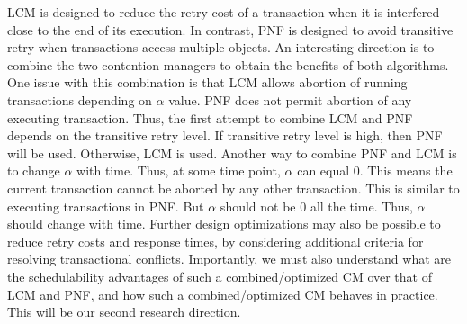 \documentclass[12pt,english]{report}
\begin{document}
LCM is designed to reduce the retry cost of a transaction when it is interfered close to the end of its execution. In contrast, PNF is designed to avoid transitive retry when transactions access multiple objects. An interesting direction is to combine the two contention managers to obtain the benefits of both algorithms. 
One issue with this combination is that LCM allows abortion of running transactions depending on $\alpha$ value. PNF does not permit abortion of any executing transaction. Thus, the first attempt to combine LCM and PNF depends on the transitive retry level. If transitive retry level is high, then PNF will be used. Otherwise, LCM is used. Another way to combine PNF and LCM is to change $\alpha$ with time. Thus, at some time point, $\alpha$ can equal $0$. This means the current transaction cannot be aborted by any other transaction. This is similar to executing transactions in PNF. But $\alpha$ should not be $0$ all the time. Thus, $\alpha$ should change with time.
Further design optimizations may also be possible to reduce retry costs and response times, by considering additional criteria for resolving transactional conflicts. Importantly, we must also understand what are the schedulability advantages of such a combined/optimized CM over that of LCM and PNF, and how such a combined/optimized CM behaves in practice. This will be our second research direction. 
\end{document}
